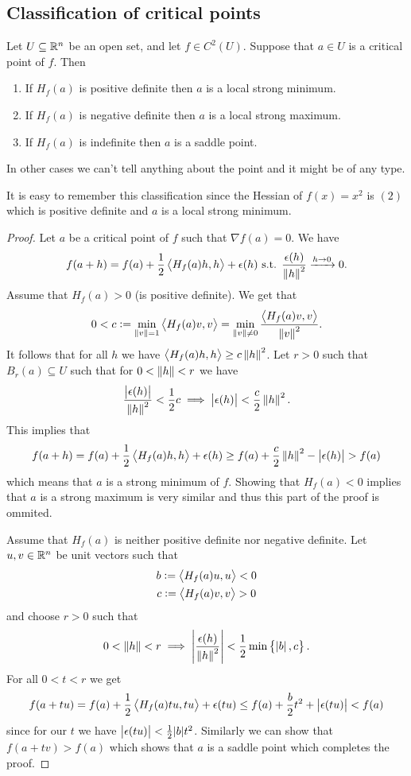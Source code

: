 \documentclass[11pt,a4paper]{article}
\begin{document}
\subsection{Classification of critical points}
\begin{proposition}
  Let $U \subseteq \mathbb{R}^n$ be an open set,
  and let $f \in C^2(U)$.
  Suppose that $a \in U$ is a critical point of $f$.
  Then
  \begin{enumerate}
    \item[(1)]
      If $H_f(a)$ is positive definite then $a$ is a local strong minimum.
    \item[(2)]
      If $H_f(a)$ is negative definite then $a$ is a local strong maximum.
    \item[(3)]
      If $H_f(a)$ is indefinite then $a$ is a saddle point.
  \end{enumerate}
\end{proposition}
\begin{remark}
  In other cases we can't tell anything about the point and it might be
  of any type.
\end{remark}
\begin{remark}
  It is easy to remember this classification since the Hessian of $f(x) = x^2$
  is $(2)$ which is positive definite and $a$ is a local strong minimum.
\end{remark}
\begin{proof}
  Let $a$ be a critical point of $f$ such that $\nabla f(a) = 0$.
  We have
  \[
    f(a + h) =
    f(a) + \frac{1}{2} \left\langle H_f(a) h, h \right\rangle + \epsilon(h) \text{ s.t. }
    \frac{\epsilon(h)}{\left\lVert h\right\rVert^2} \xrightarrow{h \to 0} 0.
  \]
  Assume that $H_f(a) > 0$ (is positive definite).
  We get that
  \[
    0 < c :=
    \min_{\left\lVert v\right\rVert = 1} \left\langle H_f(a) v, v \right\rangle =
    \min_{\left\lVert v\right\rVert \neq 0} \frac{\left\langle H_f(a) v, v \right\rangle}{\left\lVert v\right\rVert^2}.
  \]
  It follows that for all $h$ we have $\left\langle H_f(a) h, h \right\rangle \geq c \left\lVert h\right\rVert^2$.
  Let $r > 0$ such that $B_r(a) \subseteq U$ such that for $0 < \left\lVert h\right\rVert < r$
  we have
  \[
    \frac{\left\lvert\epsilon(h)\right\rvert}{\left\lVert h\right\rVert^2} < \frac{1}{2} c \implies
    \left\lvert\epsilon(h)\right\rvert < \frac{c}{2} \left\lVert h\right\rVert^2.
  \]
  This implies that
  \[
    f(a + h) = f(a) + \frac{1}{2} \left\langle H_f(a) h, h \right\rangle + \epsilon(h) \geq
    f(a) + \frac{c}{2} \left\lVert h\right\rVert^2 - \left\lvert\epsilon(h)\right\rvert > f(a)
  \]
  which means that $a$ is a strong minimum of $f$.
  Showing that $H_f(a) < 0$ implies that $a$ is a strong maximum is
  very similar and thus this part of the proof is ommited.

  Assume that $H_f(a)$ is neither positive definite nor negative definite.
  Let $u,v \in \mathbb{R}^n$ be unit vectors such that
  \begin{gather*}
    b := \left\langle H_f(a) u, u \right\rangle < 0 \\
    c := \left\langle H_f(a) v, v \right\rangle > 0
  \end{gather*}
  and choose $r > 0$ such that
  \[
    0 < \left\lVert h\right\rVert < r \implies
    \left\lvert\frac{\epsilon(h)}{\left\lVert h\right\rVert^2}\right\rvert <
    \frac{1}{2} \min\left\{\left\lvert b\right\rvert, c\right\}.
  \]
  For all $0 < t < r$ we get
  \[
    f(a + t u) = f(a) + \frac{1}{2} \left\langle H_f(a) tu, tu \right\rangle + \epsilon(tu) \le
    f(a) + \frac{b}{2} t^2 + \left\lvert\epsilon(tu)\right\rvert < f(a)
  \]
  since for our $t$ we have $\left\lvert\epsilon(tu)\right\rvert < \frac{1}{2} |b| t^2$.
  Similarly we can show that $f(a + tv) > f(a)$ which shows that $a$
  is a saddle point which completes the proof.
\end{proof}
\end{document}
